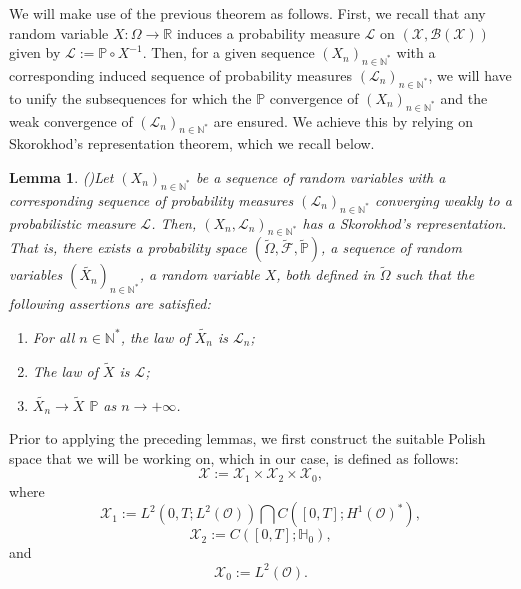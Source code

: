 \documentclass[10pt,number,preprint,times]{elsarticle}
\numberwithin{equation}{section} %
\newtheorem{lem}{Lemma}[section]
\begin{document}
\noindent
We will make use of the previous theorem as follows. First, we recall that any random variable $X : \Omega \rightarrow \mathbb{R}$ induces a probability measure $\mathcal{L}$ on $\left(\mathscr{X},\mathcal{B}(\mathscr{X})\right)$ given by 
$\mathcal{L}:=\mathbb{P} \circ X^{-1}$. Then, for a given sequence $\left(X_n\right)_{n \in \mathbb{N}^*}$ with a corresponding induced sequence of  probability measures $\left(\mathscr{L}_n\right)_{n \in \mathbb{N}^*}$, we will have to unify the subsequences for which the $\mathbb{P}$ convergence of $\left(X_n\right)_{n \in \mathbb{N}^*}$ and the weak convergence of $\left(\mathscr{L}_n\right)_{n \in \mathbb{N}^*}$ are ensured. We achieve this by relying on Skorokhod's representation theorem, which we recall below.
\begin{lem}(\cite[Theorem 2.4]{da2014stochastic})\label{skorokhod}
	Let $\left(X_n\right)_{n \in \mathbb{N}^*}$ be a sequence of random variables with a corresponding sequence of probability measures $\left(\mathscr{L}_n\right)_{n \in \mathbb{N}^*}$ converging weakly to a probabilistic measure $\mathcal{L}$. Then, $\left(X_n,\mathscr{L}_n\right)_{n \in \mathbb{N}^*}$ has a Skorokhod's representation. That is, there exists a probability space $\left(\tilde{\Omega},\tilde{\mathcal{F}},\tilde{\mathbb{P}}\right)$, a sequence of random variables $\left(\tilde{X_n}\right)_{n \in \mathbb{N}^*}$, a random variable $X$, both defined in $\tilde{\Omega}$ such that the following assertions are satisfied: 
	\begin{enumerate}
		\item For all $n \in \mathbb{N}^*$, the law of $\tilde{X_n}$ is $\mathscr{L}_n$; 
		\item  The law of $\tilde{X}$ is $\mathcal{L}$;  
		\item $\tilde{X_n} \rightarrow \tilde{X}$ $\mathbb{P}$ as $n \rightarrow +\infty$.
	\end{enumerate}
\end{lem}
\noindent
Prior to applying the preceding lemmas, we first construct the suitable Polish space that we will be working on, which in our case, is defined as follows:  
$$
\mathscr{X}:= \mathscr{X}_1 \times \mathscr{X}_2 \times \mathscr{X}_0,
$$
where
$$
\mathscr{X}_1:=L^2(0,T;L^2(\mathcal{O})) \bigcap C([0,T];H^1(\mathcal{O})^*),
$$
$$
\mathscr{X}_2:=C([0,T];\mathbb{H}_0),
$$
and
$$
\mathscr{X}_0:=L^2(\mathcal{O}).
$$
\end{document}
